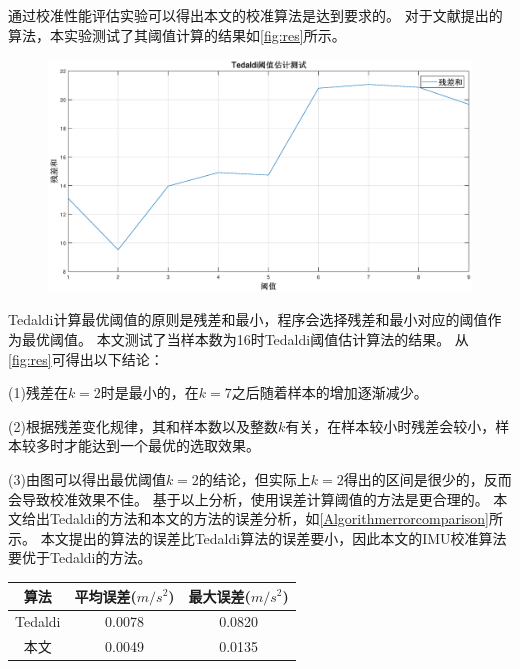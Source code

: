 \documentclass[
  type=master
]{gdutthesis}
\begin{document}
通过校准性能评估实验可以得出本文的校准算法是达到要求的。
对于文献\parencite{tedaldi2014robust}提出的算法，本实验测试了其阈值计算的结果如\autoref{fig:res}所示。
\begin{figure}[H]
	\centering
	\includegraphics[width=1.0\textwidth]{res1.eps}
	\label{fig:res}
\end{figure}

Tedaldi计算最优阈值的原则是残差和最小，程序会选择残差和最小对应的阈值作为最优阈值。
本文测试了当样本数为16时Tedaldi阈值估计算法的结果。
从\autoref{fig:res}可得出以下结论：

(1)残差在$k=2$时是最小的，在$k=7$之后随着样本的增加逐渐减少。

(2)根据残差变化规律，其和样本数以及整数$k$有关，在样本较小时残差会较小，样本较多时才能达到一个最优的选取效果。

(3)由图可以得出最优阈值$k=2$的结论，但实际上$k=2$得出的区间是很少的，反而会导致校准效果不佳。
基于以上分析，使用误差计算阈值的方法是更合理的。
本文给出Tedaldi的方法和本文的方法的误差分析，如\autoref{Algorithmerrorcomparison}所示。
本文提出的算法的误差比Tedaldi算法的误差要小，因此本文的IMU校准算法要优于Tedaldi的方法。
\begin{table}[H]
	\label{Algorithmerrorcomparison}
	\begin{tabular}{ccc}
		\toprule
		算法 & 平均误差($m/s^2$) & 最大误差($m/s^2$) \\
		\midrule
		Tedaldi & 0.0078 & 0.0820 \\
		本文 & 0.0049 & 0.0135 \\
		\bottomrule
	\end{tabular}
\end{table}
\end{document}
